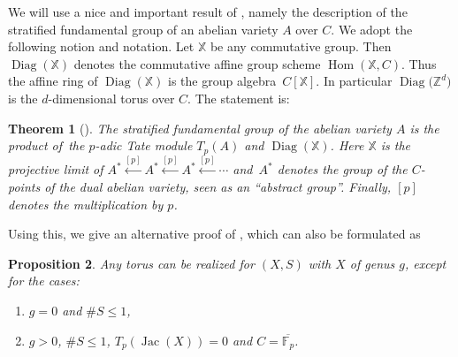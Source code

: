 \documentclass[10pt,a4paper]{amsart}
\numberwithin{equation}{section}
\newtheorem{Theorem}{Theorem}[section]
\newtheorem{Proposition}[Theorem]{Proposition}
\begin{document}
We will use a nice and important result of \cite[Theorem~21]{Sa}, namely the description of the stratified fundamental group of an abelian variety $A$ over $C$. We adopt the following notion and notation. Let $\mathbb{X}$ be any commutative group. Then $\operatorname{Diag}(\mathbb{X})$ denotes the commutative affine group scheme
$\operatorname{Hom}(\mathbb{X},C)$. Thus the affine ring of $\operatorname{Diag}(\mathbb{X})$ is the group algebra~$C[\mathbb{X}]$. In particular $\operatorname{Diag}\big(\mathbb{Z}^d\big)$ is the $d$-dimensional torus over $C$. The statement is:

\begin{Theorem}[\cite{Sa}]\label{2.4} The stratified fundamental group of the abelian variety $A$ is the product of~the $p$-adic Tate module $T_p(A)$ and $\operatorname{Diag}(\mathbb{X})$. Here $\mathbb{X}$ is the projective limit of $A^*\overset{[p]}{\leftarrow}A^*\overset{[p]}{\leftarrow}A^*\overset{[p]}{\leftarrow}\cdots$ and~$A^*$ denotes the group of the $C$-points of the dual abelian variety, seen as an ``abstract group''. Finally, $[p]$ denotes the multiplication by $p$.\end{Theorem}

Using this, we give an alternative proof of \cite[Theorem~7.1(3)]{Ma-vdP1}, which can also be formulated as

\begin{Proposition}\label{2.5} \samepage Any torus can be realized for $(X,S)$ with $X$ of genus $g$, except for the cases:
\begin{enumerate}\itemsep=0pt
\item[$(a)$] $g=0$ and $\# S \leq 1$,
\item[$(b)$] $g>0$, $\# S\leq 1$, $T_p(\operatorname{Jac}(X))=0$ and $C=\overline{\mathbb{F}_p}$.
\end{enumerate}
 \end{Proposition}
\end{document}

